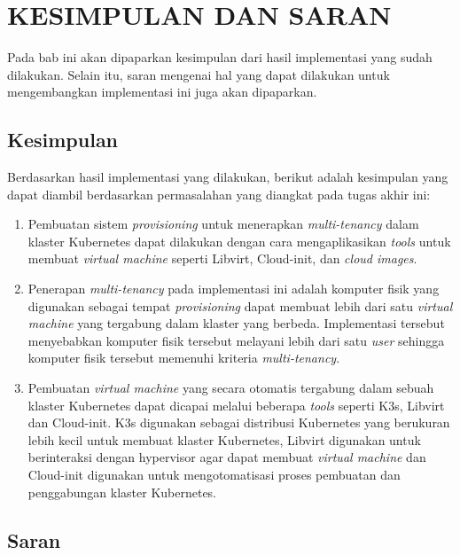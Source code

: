 \chapter{KESIMPULAN DAN SARAN}
\label{chap:penutup}

Pada bab ini akan dipaparkan kesimpulan dari hasil implementasi
yang sudah dilakukan. Selain itu, saran mengenai hal yang dapat
dilakukan untuk mengembangkan implementasi ini juga akan dipaparkan.

\section{Kesimpulan}
\label{sec:kesimpulan}

Berdasarkan hasil implementasi yang dilakukan, berikut adalah
kesimpulan yang dapat diambil berdasarkan permasalahan yang diangkat
pada tugas akhir ini:

\begin{enumerate}[nolistsep]

  \item Pembuatan sistem \emph{provisioning} untuk menerapkan \emph{multi-tenancy}
    dalam klaster Kubernetes dapat dilakukan dengan cara mengaplikasikan \emph{tools}
    untuk membuat \emph{virtual machine} seperti Libvirt, Cloud-init, dan \emph{cloud images}.

  \item Penerapan \emph{multi-tenancy} pada implementasi ini adalah
    komputer fisik yang digunakan sebagai tempat \emph{provisioning} dapat
    membuat lebih dari satu \emph{virtual machine} yang tergabung dalam
    klaster yang berbeda. Implementasi tersebut menyebabkan komputer
    fisik tersebut melayani lebih dari satu \emph{user} sehingga
    komputer fisik tersebut memenuhi kriteria \emph{multi-tenancy}.

  \item Pembuatan \emph{virtual machine} yang secara otomatis tergabung
    dalam sebuah klaster Kubernetes dapat dicapai melalui beberapa \emph{tools}
    seperti K3s, Libvirt dan Cloud-init. K3s digunakan sebagai distribusi
    Kubernetes yang berukuran lebih kecil untuk membuat klaster Kubernetes,
    Libvirt digunakan untuk berinteraksi dengan hypervisor agar dapat membuat 
    \emph{virtual machine} dan Cloud-init digunakan untuk mengotomatisasi proses
    pembuatan dan penggabungan klaster Kubernetes.

\end{enumerate}

\section{Saran}
\label{chap:saran}

